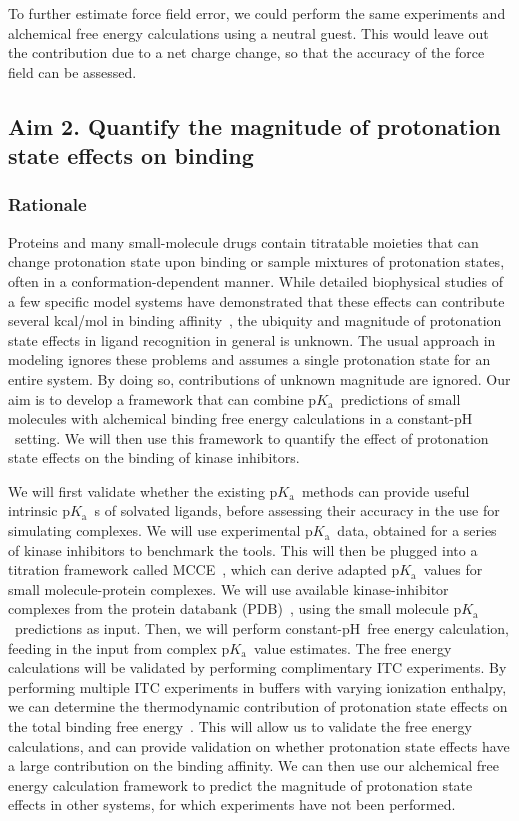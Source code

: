 \documentclass[10pt,final]{article}
\newcommand{\pKa}{p$K_\mathrm{a}$\ }
\newcommand{\pH}{p$\mathrm{H}$\ }
\begin{document}
To further estimate force field error, we could perform the same experiments and alchemical free energy calculations using a neutral guest. 
%
This would leave out the contribution due to a net charge change, so that the accuracy of the force field can be assessed.


\subsection*{Aim 2. Quantify the magnitude of protonation state effects on binding}
\subsubsection*{Rationale}
Proteins and many small-molecule drugs contain titratable moieties that can change protonation state upon binding or sample mixtures of protonation states, often in a conformation-dependent manner.
%
While detailed biophysical studies of a few specific model systems have demonstrated that these effects can contribute several kcal/mol in binding affinity~\autocite{Dullweber2001a,Aleksandrov2007a,Czodrowski2007a,Steuber2007a,Czodrowski2007b},
the ubiquity and magnitude of protonation state effects in ligand recognition in general is unknown.
%
The usual approach in modeling ignores these problems and assumes a single protonation state for an entire system.
%
By doing so, contributions of unknown magnitude are ignored.
%
Our aim is to develop a framework that can combine \pKa predictions of small molecules with alchemical binding free energy calculations in a constant-\pH setting.
%
We will then use this framework to quantify the effect of protonation state effects on the binding of kinase inhibitors.


We will first validate whether the existing \pKa methods can provide useful intrinsic \pKa s of solvated ligands, before assessing their accuracy in the use for simulating complexes.
%
We will use experimental \pKa data, obtained for a series of kinase inhibitors to benchmark the tools.
%
This will then be plugged into a titration framework called MCCE~\autocite{Song2009a}, which can derive adapted \pKa values for small molecule-protein  complexes.
%
We will use available kinase-inhibitor complexes from the protein databank (PDB)~\autocite{Berman2000a}, using the small molecule \pKa predictions as input.
%
Then, we will perform constant-\pH free energy calculation, feeding in the input from complex \pKa value estimates.
%
The free energy calculations will be validated by performing complimentary ITC experiments.
%
By performing multiple ITC experiments in buffers with varying ionization enthalpy, we can determine the thermodynamic contribution of protonation state effects on the total binding free energy~\autocite{Baker1996a,Neeb2014a}.
%
This will allow us to validate the free energy calculations, and can provide validation on whether protonation state effects have a large contribution on the binding affinity.
%
We can then use our alchemical free energy calculation framework to predict the magnitude of protonation state effects in other systems, for which experiments have not been performed.
\end{document}
